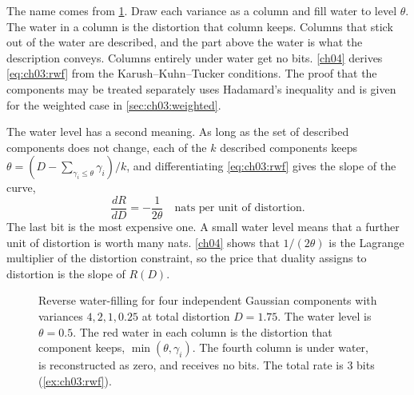 The name comes from \cref{fig:ch03:rwf}. Draw each variance as a column and fill water to level $\theta$. The water in a column is the distortion that column keeps. Columns that stick out of the water are described, and the part above the water is what the description conveys. Columns entirely under water get no bits. \cref{ch04} derives \eqref{eq:ch03:rwf} from the Karush--Kuhn--Tucker conditions. The proof that the components may be treated separately uses Hadamard's inequality and is given for the weighted case in \cref{sec:ch03:weighted}.

The water level has a second meaning. As long as the set of described components does not change, each of the $k$ described components keeps $\theta=(D-\sum_{\gamma_i\le\theta}\gamma_i)/k$, and differentiating \eqref{eq:ch03:rwf} gives the slope of the curve,
\begin{equation}\label{eq:ch03:slope}
\frac{dR}{dD}=-\frac{1}{2\theta}\quad\text{nats per unit of distortion}.
\end{equation}
The last bit is the most expensive one. A small water level means that a further unit of distortion is worth many nats. \cref{ch04} shows that $1/(2\theta)$ is the Lagrange multiplier of the distortion constraint, so the price that duality assigns to distortion is the slope of $R(D)$.

\begin{figure}[tbp]
\centering
{}
\caption{Reverse water-filling for four independent Gaussian components with variances $4,2,1,0.25$ at total distortion $D=1.75$. The water level is $\theta=0.5$. The red water in each column is the distortion that component keeps, $\min(\theta,\gamma_i)$. The fourth column is under water, is reconstructed as zero, and receives no bits. The total rate is $3$ bits (\cref{ex:ch03:rwf}).}
\label{fig:ch03:rwf}
\end{figure}

